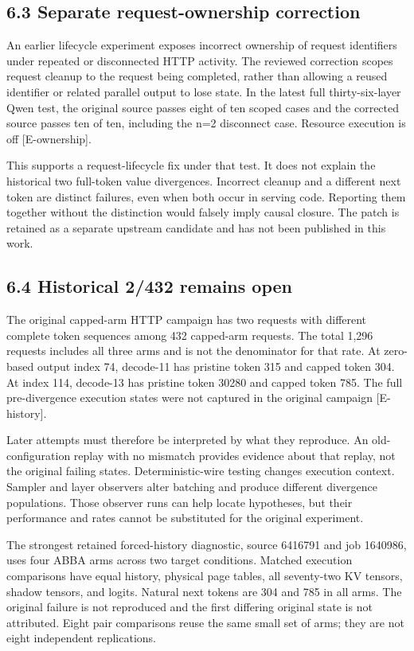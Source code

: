\documentclass[11pt,a4paper]{article}
\begin{document}
\subsection*{6.3 Separate request-ownership correction}

An earlier lifecycle experiment exposes incorrect ownership of request identifiers under repeated or disconnected HTTP activity. The reviewed correction scopes request cleanup to the request being completed, rather than allowing a reused identifier or related parallel output to lose state. In the latest full thirty-six-layer Qwen test, the original source passes eight of ten scoped cases and the corrected source passes ten of ten, including the n=2 disconnect case. Resource execution is off [E-ownership].


This supports a request-lifecycle fix under that test. It does not explain the historical two full-token value divergences. Incorrect cleanup and a different next token are distinct failures, even when both occur in serving code. Reporting them together without the distinction would falsely imply causal closure. The patch is retained as a separate upstream candidate and has not been published in this work.


\subsection*{6.4 Historical 2/\allowbreak{}432 remains open}

The original capped-arm HTTP campaign has two requests with different complete token sequences among 432 capped-arm requests. The total 1,296 requests includes all three arms and is not the denominator for that rate. At zero-based output index 74, decode-11 has pristine token 315 and capped token 304. At index 114, decode-13 has pristine token 30280 and capped token 785. The full pre-divergence execution states were not captured in the original campaign [E-history].


Later attempts must therefore be interpreted by what they reproduce. An old-configuration replay with no mismatch provides evidence about that replay, not the original failing states. Deterministic-wire testing changes execution context. Sampler and layer observers alter batching and produce different divergence populations. Those observer runs can help locate hypotheses, but their performance and rates cannot be substituted for the original experiment.


The strongest retained forced-history diagnostic, source 6416791 and job 1640986, uses four ABBA arms across two target conditions. Matched execution comparisons have equal history, physical page tables, all seventy-two KV tensors, shadow tensors, and logits. Natural next tokens are 304 and 785 in all arms. The original failure is not reproduced and the first differing original state is not attributed. Eight pair comparisons reuse the same small set of arms; they are not eight independent replications.
\end{document}
